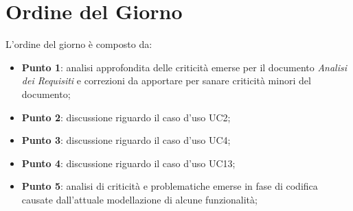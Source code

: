 \section{Ordine del Giorno}
L'ordine del giorno è composto da: 
\begin{itemize}
	\item \textbf{Punto 1}: analisi approfondita delle criticità emerse per il documento \textit{Analisi dei Requisiti} e correzioni da apportare per sanare criticità minori del documento;
	\item \textbf{Punto 2}: discussione riguardo il caso d'uso UC2;
	\item \textbf{Punto 3}: discussione riguardo il caso d'uso UC4;  
	\item \textbf{Punto 4}: discussione riguardo il caso d'uso UC13;
	\item \textbf{Punto 5}: analisi di criticità e problematiche emerse in fase di codifica causate dall'attuale modellazione di alcune funzionalità;
\end{itemize}